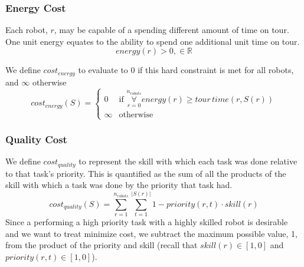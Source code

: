 \documentclass[a4paper]{article}
\begin{document}
\subsubsection{Energy Cost}

Each robot, $r$, may be capable of a spending different amount of time on tour. One unit energy equates to the ability to spend one additional unit time on tour.
$$\mathit{energy}(r) > 0, \in \mathbb{R}$$

We define $\mathit{cost}_\mathit{energy}$ to evaluate to 0 if this hard constraint is met for all robots, and $\infty$ otherwise
$$
\mathit{cost}_\mathit{energy}(S) = \begin{cases}
0 & \text{if } \mathop{\forall}\limits_{r=0}^{n_\mathit{robots}} \mathit{energy}(r) \geq \mathit{tour \, time}(r, S(r)) \\
\infty & \text{otherwise}
\end{cases}
$$

\subsubsection{Quality Cost}

We define $\mathit{cost}_\mathit{quality}$ to represent the skill with which each task was done relative to that task's priority. This is quantified as the sum of all the products of the skill with which a task was done by the priority that task had.
$$
\mathit{cost}_\mathit{quality}(S) =
  \sum^{n_\mathit{robots}}_{r=1}
  \sum^{|S(r)|}_{t=1}
  1 - \mathit{priority}(r, t) \cdot \mathit{skill}(r)
$$
Since a performing a high priority task with a highly skilled robot is desirable and we want to treat minimize cost, we subtract the maximum possible value, 1, from the product of the priority and skill (recall that $\mathit{skill}(r) \in [1, 0]$ and $\mathit{priority}(r, t) \in [1, 0]$).



\end{document}
